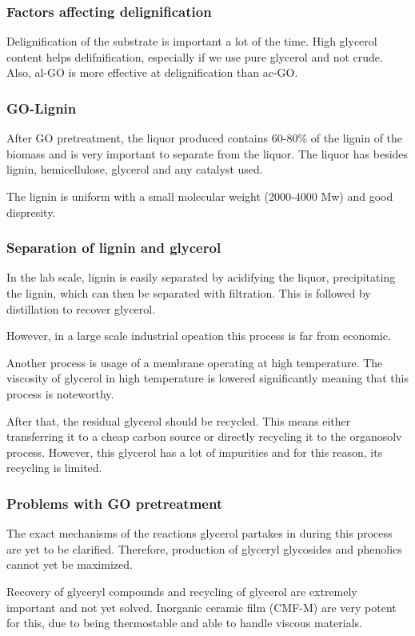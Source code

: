 \documentclass[11pt]{article}
\begin{document}
\subsubsection{Factors affecting delignification}
\label{sec:org607ede1}
Delignification of the substrate is important a lot of the time. High glycerol content helps delifnification, especially if we use pure glycerol and not crude. Also, al-GO is more effective at delignification than ac-GO.
\subsubsection{GO-Lignin}
\label{sec:orgc8db558}
After GO pretreatment, the liquor produced contains 60-80\% of the lignin of the biomass and is very important to separate from the liquor. The liquor has besides lignin, hemicellulose, glycerol and any catalyst used.

The lignin is uniform with a small molecular weight (2000-4000 Mw) and good dispresity.
\subsubsection{Separation of lignin and glycerol}
\label{sec:orgb405c9b}
In the lab scale, lignin is easily separated by acidifying the liquor, precipitating the lignin, which can then be separated with filtration. This is followed by distillation to recover glycerol.

However, in a large scale industrial opeation this process is far from economic.

Another process is usage of a membrane operating at high temperature. The viscosity of glycerol in high temperature is lowered significantly meaning that this process is noteworthy.

After that, the residual glycerol should be recycled. This means either transferring it to a cheap carbon source or directly recycling it to the organosolv process. However, this glycerol has a lot of impurities and for this reason, its recycling is limited.
\subsubsection{Problems with GO pretreatment}
\label{sec:org422c543}
The exact mechanisms of the reactions glycerol partakes in during this process are yet to be clarified. Therefore, production of glyceryl glycosides and phenolics cannot yet be maximized.

Recovery of glyceryl compounds and recycling of glycerol are extremely important and not yet solved. Inorganic ceramic film (CMF-M) are very potent for this, due to being thermostable and able to handle viscous materials.
\end{document}
